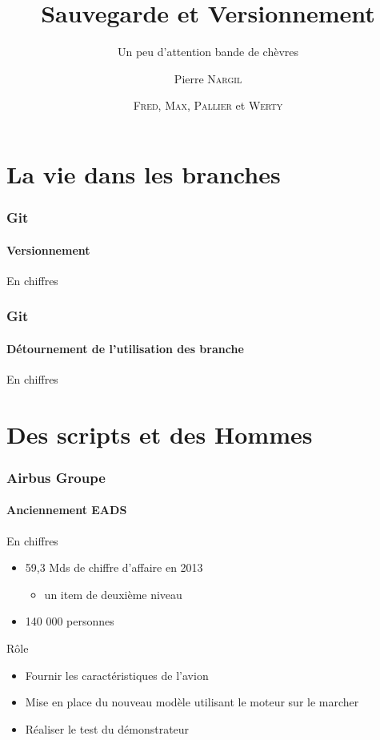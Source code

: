 \documentclass[12pt]{beamer}
\title{Sauvegarde et Versionnement}
\subtitle{Un peu d'attention bande de chèvres}
\author{Pierre \textsc{Nargil}}
\begin{document}
\frame{\titlepage}
\author{\textsc{Fred}, \textsc{Max}, \textsc{Pallier} et \textsc{Werty}}

\frame{\tableofcontents}
\addtocounter{framenumber}{-1}


\section{La vie dans les branches}
\begin{frame}

\frametitle{Git}
\framesubtitle{Versionnement}

\begin{block}{En chiffres}
\end{block}

\end{frame}
\begin{frame}

\frametitle{Git}
\framesubtitle{Détournement de l'utilisation des branche}

\begin{block}{En chiffres}
\end{block}

\end{frame}

\section{Des scripts et des Hommes}
\begin{frame}

\frametitle{Airbus Groupe}
\framesubtitle{Anciennement EADS}

\begin{block}{En chiffres}
\begin{itemize}
  \item 59,3 Mds de chiffre d'affaire en 2013
  \begin{itemize}
     \item un item de deuxième niveau
  \end{itemize}
  \item 140 000 personnes
\end{itemize}
\end{block}
\begin{block}{Rôle}
\begin{itemize}
  \item Fournir les caractéristiques de l'avion
  \item Mise en place du nouveau modèle utilisant le moteur sur le marcher
  \item Réaliser le test du démonstrateur
\end{itemize}
\end{block}

\end{frame}
\end{document}
